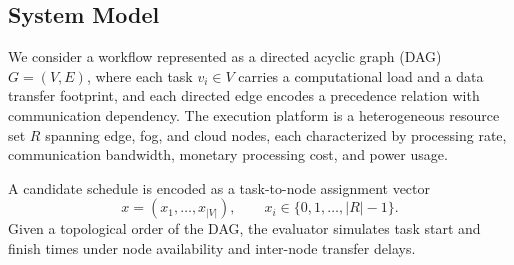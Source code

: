 \documentclass[preprint,12pt]{elsarticle}
\begin{document}
\subsection{System Model}
We consider a workflow represented as a directed acyclic graph (DAG) $G=(V,E)$, where each task $v_i \in V$ carries a computational load and a data transfer footprint, and each directed edge encodes a precedence relation with communication dependency. The execution platform is a heterogeneous resource set $R$ spanning edge, fog, and cloud nodes, each characterized by processing rate, communication bandwidth, monetary processing cost, and power usage.

A candidate schedule is encoded as a task-to-node assignment vector
\begin{equation}
x=(x_1,\ldots,x_{|V|}), \qquad x_i \in \{0,1,\ldots,|R|-1\}.
\end{equation}
Given a topological order of the DAG, the evaluator simulates task start and finish times under node availability and inter-node transfer delays.
\end{document}

